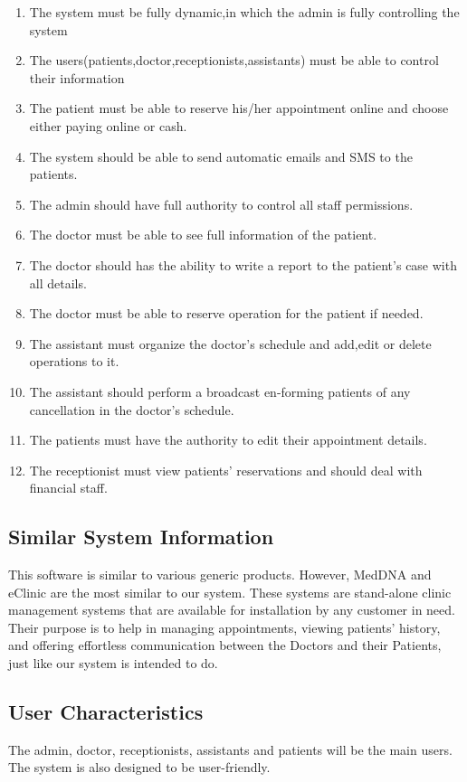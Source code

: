 \documentclass[]{article}
\begin{document}
\begin{enumerate}
  \item The system must be fully dynamic,in which the admin is fully controlling the system
  \item The users(patients,doctor,receptionists,assistants) must be able to control their information 
  \item The patient must be able to reserve his/her appointment online and choose either paying online or cash.
  \item The system should be able to send automatic emails and SMS to the patients.
  \item The admin should have full authority to control all staff permissions.
  \item The doctor must be able to see full information of the patient.
  \item The doctor should has the ability to write a report to the patient's case with all details.
  \item The doctor must be able to reserve operation for the patient if needed.
  \item The assistant must organize the doctor's schedule and add,edit or delete operations to it.
  \item The assistant should perform a broadcast en-forming patients of any cancellation in the doctor's schedule.
  \item The patients must have the authority to edit their appointment details.
  \item The receptionist must view patients' reservations and should deal with financial staff.
\end{enumerate}

\subsection{Similar System Information}
This software is similar to various generic products. However, MedDNA and eClinic are the most similar to our system. These systems are stand-alone clinic management systems that are available for installation by any customer in need. Their purpose is to help in managing appointments, viewing patients' history, and offering effortless communication between the Doctors and their Patients, just like our system is intended to do.


\subsection{ User Characteristics}
The admin, doctor, receptionists, assistants and patients will be the main users. The system is also designed to be user-friendly. 
\end{document}
